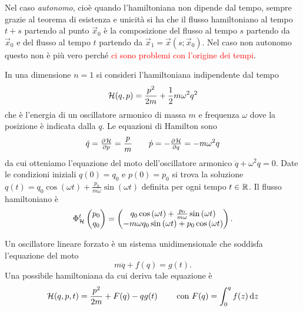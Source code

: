 Nel caso \emph{autonomo}, cioè quando l'hamiltoniana non dipende dal tempo, sempre grazie al teorema di esistenza e unicità si ha che il flusso hamiltoniano al tempo $ t+s $ partendo al punto $ \vec{x}_0 $ è la composizione del flusso al tempo $ s $ partendo da $ \vec{x}_0 $ e del flusso al tempo $ t $ partendo da $ \vec{x}_1 = \vec{x}(s; \vec{x}_0) $. Nel caso non autonomo questo non è più vero perché \textcolor{red}{ci sono problemi con l'origine dei tempi}.

\begin{example}
    In una dimensione $ n = 1 $ si consideri l'hamiltoniana indipendente dal tempo
    \[
        \mathcal{H}(q, p) = \frac{p^2}{2m} + \frac{1}{2} m \omega^2 q^2
    \]
    che è l'energia di un oscillatore armonico di massa $ m $ e frequenza $ \omega $ dove la posizione è indicata dalla $ q $. Le equazioni di Hamilton sono
    \[
        \dot{q} = \pd{\ham}{p} = \frac{p}{m} \qquad \dot{p} = -\pd{\ham}{q} = -m\omega^2 q
    \]
    da cui otteniamo l'equazione del moto dell'oscillatore armonico $ \ddot{q} + \omega^2 q = 0 $. Date le condizioni iniziali $ q(0) = q_0 $ e $ p(0) = p_0 $ si trova la soluzione $ q(t) = q_0 \cos{(\omega t)} + \frac{p_0}{m\omega} \sin{(\omega t)} $ definita per ogni tempo $ t \in \mathbb{R} $. Il flusso hamiltoniano è
    \[
        \Phi^t_{\mathcal{H}}
        \begin{pmatrix}
        p_0 \\
        q_0
        \end{pmatrix}
        =
        \begin{pmatrix}
        q_0 \cos{(\omega t)} + \frac{p_0}{m\omega} \sin{(\omega t)} \\
        -m \omega q_0 \sin{(\omega t)} + p_0\cos{(\omega t)}
        \end{pmatrix}.
    \]
\end{example}

\begin{example}
    Un oscillatore lineare forzato è un sistema unidimensionale che soddisfa l'equazione del moto
    \[
        m\ddot{q} + f(q) = g(t).
    \]
    Una possibile hamiltoniana da cui deriva tale equazione è
    \[
        \ham(q, p, t) = \frac{p^2}{2m} + F(q) - q g(t) \qquad \text{ con } F(q) = \int_0^q f(z) \dif{z}
    \]
\end{example}

